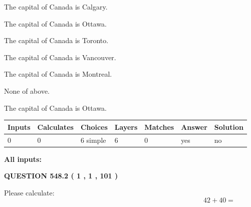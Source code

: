 \documentclass[12pt]{article}
\begin{document}
 
The capital of Canada is Calgary.
 
 
The capital of Canada is Ottawa.
 
 
The capital of Canada is Toronto.
 
 
The capital of Canada is Vancouver.
 
 
The capital of Canada is Montreal.
 
 
 None of above.
 
 
\noindent{}
 
 
The capital of Canada is Ottawa.
 
 
\noindent{}
 
 
   
   
   
   
\noindent\begin{tabular}{|l|l|l|l|l|l|l|}
 \hline
Inputs & Calculates & Choices & Layers & Matches & Answer & Solution \\ \hline
 0  & 
 0  & 
 6
  simple  
  & 
 6  & 
 0  & 
  yes & 
  no 
  \\ \hline
 \end{tabular}
   
   
   
   
\noindent{}
   
   
   
   
\noindent\vspace{0.1in}\hspace{-0.08in} {\textbf{\Large{All inputs: }}}
   
   
  
\vspace{0.2in}
  
{\textbf{\Large{QUESTION
548.2 
 ( 1 , 1 , 101 )
}}}
  
  
 
Please calculate:
\begin{equation}
42 +  %
40 = \nonumber
\end{equation}
 
 
 
\noindent{}
 
\end{document}
